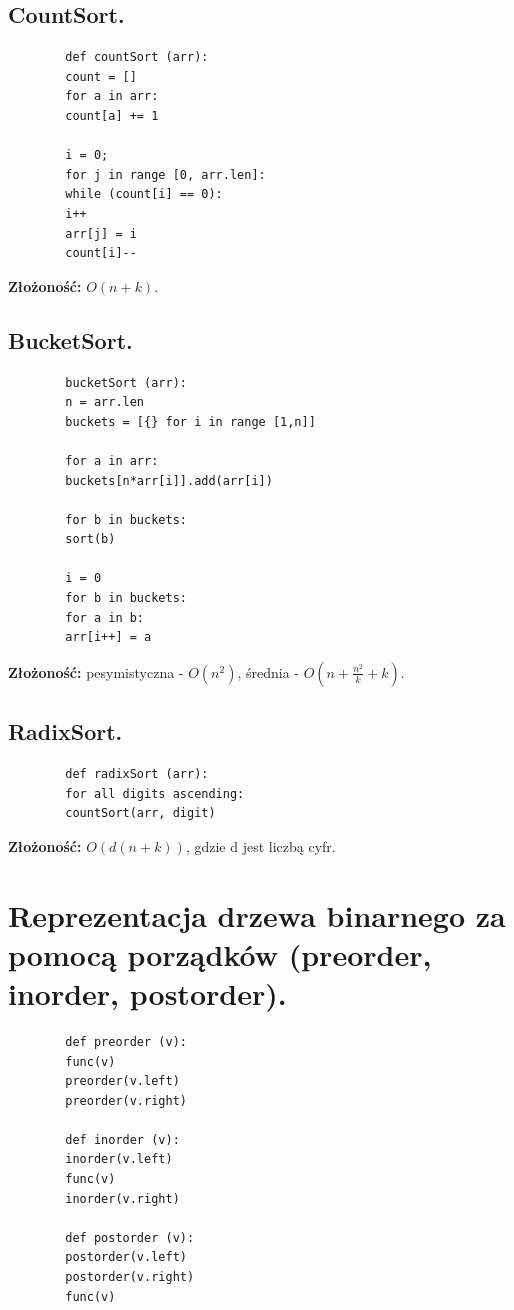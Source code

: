 \documentclass[12pt]{article}
\begin{document}
    \subsection{CountSort.}
    \begin{verbatim}
        def countSort (arr):
        count = []
        for a in arr:
        count[a] += 1

        i = 0;
        for j in range [0, arr.len]:
        while (count[i] == 0):
        i++
        arr[j] = i
        count[i]--
    \end{verbatim}
    \textbf{Złożoność:} $O(n+k)$.

    \subsection{BucketSort.}
    \begin{verbatim}
        bucketSort (arr):
        n = arr.len
        buckets = [{} for i in range [1,n]]

        for a in arr:
        buckets[n*arr[i]].add(arr[i])

        for b in buckets:
        sort(b)

        i = 0
        for b in buckets:
        for a in b:
        arr[i++] = a
    \end{verbatim}
    \textbf{Złożoność:} pesymistyczna -  $O(n^2)$, średnia - $O(n + \frac{n^2}{k} + k)$.

    \subsection{RadixSort.}
    \begin{verbatim}
        def radixSort (arr):
        for all digits ascending:
        countSort(arr, digit)
    \end{verbatim}
    \textbf{Złożoność:} $O(d(n+k))$, gdzie d jest liczbą cyfr.

    \newpage

    \section{Reprezentacja drzewa binarnego za pomocą porządków (preorder, inorder, postorder).}


    \begin{verbatim}
        def preorder (v):
        func(v)
        preorder(v.left)
        preorder(v.right)

        def inorder (v):
        inorder(v.left)
        func(v)
        inorder(v.right)

        def postorder (v):
        postorder(v.left)
        postorder(v.right)
        func(v)
    \end{verbatim}
\end{document}
